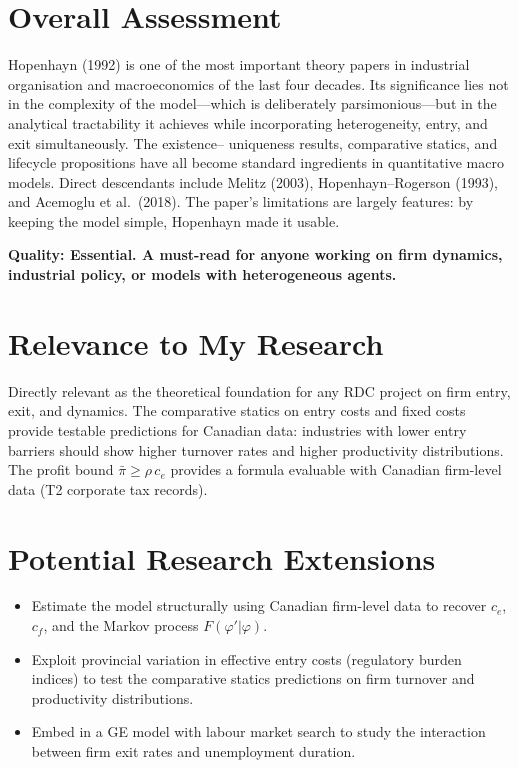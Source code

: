 \section{Overall Assessment}

Hopenhayn (1992) is one of the most important theory papers in industrial
organisation and macroeconomics of the last four decades. Its significance
lies not in the complexity of the model---which is deliberately
parsimonious---but in the analytical tractability it achieves while
incorporating heterogeneity, entry, and exit simultaneously. The existence--
uniqueness results, comparative statics, and lifecycle propositions have all
become standard ingredients in quantitative macro models. Direct descendants
include Melitz (2003), Hopenhayn--Rogerson (1993), and Acemoglu et al.\
(2018). The paper's limitations are largely features: by keeping the model
simple, Hopenhayn made it usable.

\textbf{Quality: Essential. A must-read for anyone working on firm dynamics,
industrial policy, or models with heterogeneous agents.}

\section{Relevance to My Research}

Directly relevant as the theoretical foundation for any RDC project on firm
entry, exit, and dynamics. The comparative statics on entry costs and fixed
costs provide testable predictions for Canadian data: industries with lower
entry barriers should show higher turnover rates and higher productivity
distributions. The profit bound $\bar{\pi} \geq \rho\, c_e$ provides a
formula evaluable with Canadian firm-level data (T2 corporate tax records).

\section{Potential Research Extensions}

\begin{itemize}
  \item Estimate the model structurally using Canadian firm-level data to
    recover $c_e$, $c_f$, and the Markov process $F(\varphi'|\varphi)$.
  \item Exploit provincial variation in effective entry costs (regulatory
    burden indices) to test the comparative statics predictions on firm
    turnover and productivity distributions.
  \item Embed in a GE model with labour market search to study the interaction
    between firm exit rates and unemployment duration.
\end{itemize}

